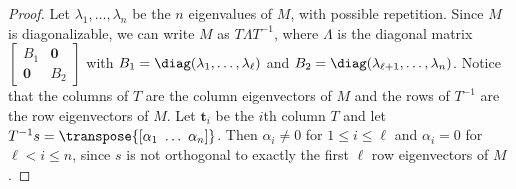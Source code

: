 \documentclass[11pt]{article}
\begin{document}
\begin{proof}
 Let $\lambda_{1}, \dotsc, \lambda_n$ be the $n$ eigenvalues of $M$,
 with possible repetition.
 Since $M$ is diagonalizable,
 we can write $M$  as $T \Lambda T^{-1}$,
 where $\Lambda$ is the diagonal matrix $\left[\begin{smallmatrix} B_1 & \mathbf{0} \\ \mathbf{0} & B_2 \end{smallmatrix}\right]$
 with $B_1 = \diag(\lambda_1, \dotsc, \lambda_\ell)$ and
 $B_2 = \diag(\lambda_{\ell+1}, \dotsc, \lambda_n)$.
 Notice that the columns of $T$ are the column eigenvectors of $M$ and the rows of $T^{-1}$ are the row eigenvectors of $M$.
 Let $\mathbf{t}_i$ be the $i$th column $T$ and let $T^{-1} s = \transpose{[\alpha_1\ \ldots\ \alpha_n]}$.
 Then $\alpha_i \ne 0$ for $1 \le i \le \ell$ and $\alpha_i = 0$ for $\ell < i \le n$,
 since $s$ is not orthogonal to exactly the first $\ell$ row eigenvectors of $M$.
 

\end{proof}
\end{document}

